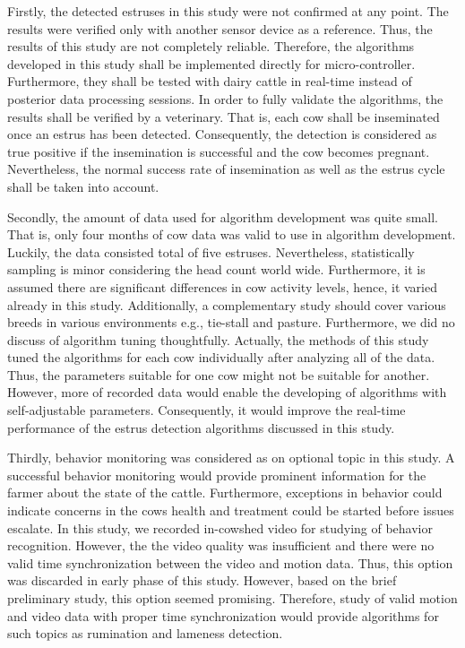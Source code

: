 \documentclass[english,12pt,a4paper,pdftex,elec,utf8]{aaltothesis}
\begin{document}
Firstly, the detected estruses in this study were not confirmed at any point. The results were verified only with another sensor device as a reference. Thus, the results of this study are not completely reliable. Therefore, the algorithms developed in this study shall be implemented directly for micro-controller. Furthermore, they shall be tested with dairy cattle in real-time instead of posterior data processing sessions. In order to fully validate the algorithms, the results shall be verified by a veterinary. That is, each cow shall be inseminated once an estrus has been detected. Consequently, the detection is considered as true positive if the insemination is successful and the cow becomes pregnant.  Nevertheless, the normal success rate of insemination as well as the estrus cycle shall be taken into account.

Secondly, the amount of data used for algorithm development was quite small. That is, only four months of cow data was valid to use in algorithm development. Luckily, the data consisted total of five estruses. Nevertheless, statistically sampling is minor considering the head count world wide. Furthermore, it is assumed there are significant differences in cow activity levels, hence, it varied already in this study. Additionally, a complementary study should cover various breeds in various environments e.g., tie-stall and pasture. Furthermore, we did no discuss of  algorithm tuning thoughtfully. Actually, the methods of this study tuned the algorithms for each cow individually after analyzing all of the data. Thus, the parameters suitable for one cow might not be suitable for another. However, more of recorded data would enable the developing of algorithms with self-adjustable parameters. Consequently, it would improve the real-time performance of the estrus detection algorithms discussed in this study.

Thirdly, behavior monitoring was considered as on optional topic in this study. A successful behavior monitoring would provide prominent information for the farmer about the state of the cattle. Furthermore, exceptions in behavior could indicate concerns in the cows health and treatment could be started before issues escalate. In this study, we recorded in-cowshed video for studying of behavior recognition. However, the the video quality was insufficient and there were no valid time synchronization between the video and motion data. Thus, this option was discarded in early phase of this study. However, based on the brief preliminary study, this option seemed promising. Therefore, study of valid motion and video data with proper time synchronization would provide algorithms for such topics as rumination and lameness detection.
\end{document}
